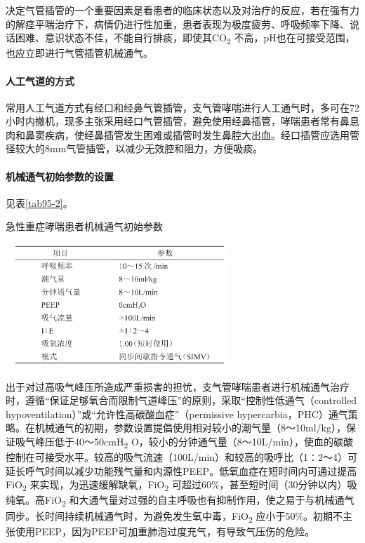 决定气管插管的一个重要因素是看患者的临床状态以及对治疗的反应，若在强有力的解痉平喘治疗下，病情仍进行性加重，患者表现为极度疲劳、呼吸频率下降、说话困难、意识状态不佳，不能自行排痰，即使其CO\textsubscript{2}
不高，pH也在可接受范围，也应立即进行气管插管机械通气。

\paragraph{人工气道的方式}

常用人工气道方式有经口和经鼻气管插管，支气管哮喘进行人工通气时，多可在72小时内撤机，现多主张采用经口气管插管，避免使用经鼻插管，哮喘患者常有鼻息肉和鼻窦疾病，使经鼻插管发生困难或插管时发生鼻腔大出血。经口插管应选用管径较大的8mm气管插管，以减少无效腔和阻力，方便吸痰。

\paragraph{机械通气初始参数的设置}

见表\ref{tab95-2}。

\begin{table}[htbp]
\centering
\caption{急性重症哮喘患者机械通气初始参数}
\label{tab95-2}
\includegraphics[width=3.29167in,height=1.83333in]{./images/Image00395.jpg}
\end{table}

出于对过高吸气峰压所造成严重损害的担忧，支气管哮喘患者进行机械通气治疗时，遵循“保证足够氧合而限制气道峰压”的原则，采取“控制性低通气（controlled
hypoventilation）”或“允许性高碳酸血症”（permissive
hypercarbia，PHC）通气策略。在机械通气的初期，参数设置提倡使用相对较小的潮气量（8～10ml/kg），保证吸气峰压低于40～50cmH\textsubscript{2}
O，较小的分钟通气量（8～10L/min），使血的碳酸控制在可接受水平。较高的吸气流速（100L/min）和较高的吸呼比（1∶2～4）可延长呼气时间以减少功能残气量和内源性PEEP。低氧血症在短时间内可通过提高FiO\textsubscript{2}
来实现，为迅速缓解缺氧，FiO\textsubscript{2}
可超过60\%，甚至短时间（30分钟以内）吸纯氧。高FiO\textsubscript{2}
和大通气量对过强的自主呼吸也有抑制作用，使之易于与机械通气同步。长时间持续机械通气时，为避免发生氧中毒，FiO\textsubscript{2}
应小于50\%。初期不主张使用PEEP，因为PEEP可加重肺泡过度充气，有导致气压伤的危险。

